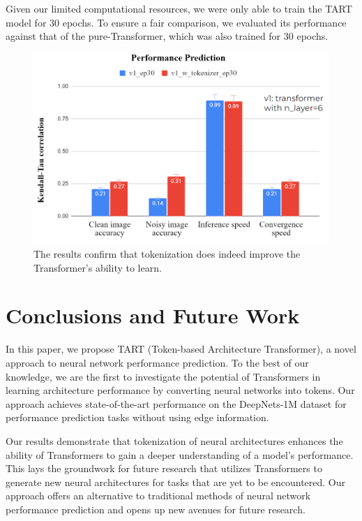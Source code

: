 \documentclass{article}
\begin{document}
Given our limited computational resources, we were only able to train the TART model for 30 epochs. To ensure a fair comparison, we evaluated its performance against that of the pure-Transformer, which was also trained for 30 epochs.

\begin{figure}
    \centering
    \includegraphics[width=\textwidth]{images/exp2_results.png}
    \caption{The results confirm that tokenization does indeed improve the Transformer's ability to learn.}
    \label{exp2_results}
\end{figure}


\section{Conclusions and Future Work}
In this paper, we propose TART (Token-based Architecture Transformer), a novel approach to neural network performance prediction. To the best of our knowledge, we are the first to investigate the potential of Transformers in learning architecture performance by converting neural networks into tokens. Our approach achieves state-of-the-art performance on the DeepNets-1M dataset for performance prediction tasks without using edge information.

Our results demonstrate that tokenization of neural architectures enhances the ability of Transformers to gain a deeper understanding of a model's performance. This lays the groundwork for future research that utilizes Transformers to generate new neural architectures for tasks that are yet to be encountered. Our approach offers an alternative to traditional methods of neural network performance prediction and opens up new avenues for future research.
\end{document}
